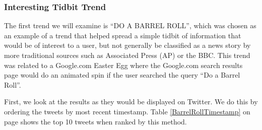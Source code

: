 \documentclass[10pt]{proc}
\begin{document}
    \subsubsection{Interesting Tidbit Trend}
    The first trend we will examine is ``DO A BARREL ROLL'', which was chosen as an example of a trend that helped spread a simple tidbit of information that would be of interest to a user, but not generally be classified as a news story by more traditional sources such as Associated Press (AP) or the BBC. This trend was related to a Google.com Easter Egg where the Google.com search results page would do an animated spin if the user searched the query ``Do a Barrel Roll''.

    First, we look at the results as they would be displayed on Twitter. We do this by ordering the tweets by most recent timestamp. Table \ref{BarrelRollTimestamp} on page \pageref{BarrelRollTimestamp} shows the top 10 tweets when ranked by this method.
\end{document}
